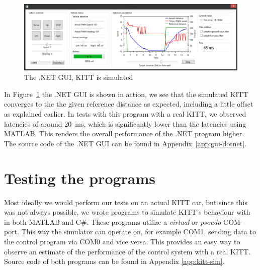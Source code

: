 \documentclass[11pt,titlepage]{report}
\begin{document}
\begin{figure}[H]
	\centering
	\includegraphics[width=\linewidth]{resource/gui-dotnet.png}
	\caption{The .NET GUI, KITT is simulated}
	\label{fig:int-gui-dotnet}
\end{figure}

In Figure~\ref{fig:int-gui-dotnet} the .NET GUI is shown in action, we see that the simulated KITT converges to the the given reference distance as expected, including a little offset as explained earlier. In tests with this program with a real KITT, we observed latencies of around \SI{20}{ms}, which is significantly lower than the latencies using MATLAB. This renders the overall performance of the .NET program higher.
\\
The source code of the .NET GUI can be found in Appendix~\ref{app:gui-dotnet}.

\section{Testing the programs}
Most ideally we would perform our tests on an actual KITT car, but since this was not always possible, we wrote programs to simulate KITT's behaviour with in both MATLAB and C\#. These programs utilize a \textit{virtual} or \textit{pseudo} COM-port. This way the simulator can operate on, for example COM1, sending data to the control program via COM0 and vice versa. This provides an easy way to observe an estimate of the performance of the control system with a real KITT.
\\
Source code of both programs can be found in Appendix \ref{app:kitt-sim}.
\end{document}

